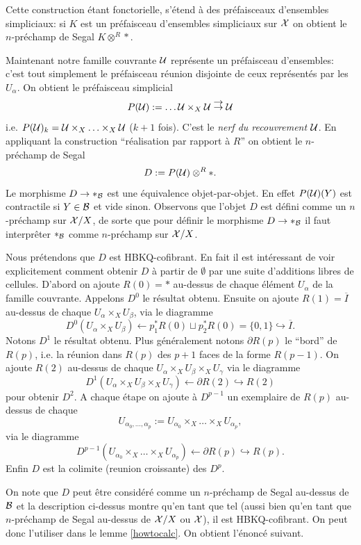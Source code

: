 \documentclass[12pt]{article}
\newcommand{\Bb}{{\cal B}}
\newcommand{\Uu}{{\cal U}}
\newcommand{\Xx}{{\cal X}}
\newcommand{\tworightarrows}{\stackrel{\displaystyle \rightarrow}{\rightarrow}}
\begin{document}
Cette construction \'etant fonctorielle, s'\'etend \`a des pr\'efaisceaux
d'ensembles simpliciaux: si $K$ est un pr\'efaisceau d'ensembles simpliciaux sur
$\Xx$ on obtient le $n$-pr\'echamp de Segal $K\otimes ^R\ast$.

Maintenant notre famille couvrante $\Uu$ repr\'esente un pr\'efaisceau
d'ensembles: c'est tout simplement le pr\'efaisceau r\'eunion disjointe
de ceux repr\'esent\'es
par les $U_{\alpha}$. On obtient le pr\'efaisceau simplicial
$$
P(\Uu ):= \ldots \Uu \times _X \Uu \tworightarrows \Uu
$$
i.e. $P(\Uu )_k=\Uu \times _X \ldots \times _X\Uu $ ($k+1$ fois).
C'est le {\em nerf du recouvrement $\Uu$}. En appliquant la construction
``r\'ealisation par rapport \`a $R$'' on obtient le $n$-pr\'echamp de Segal
$$
D:= P(\Uu )\otimes ^R \ast .
$$
Le morphisme $D\rightarrow \ast _{\Bb}$ est une
\'equivalence objet-par-objet.  En effet $P(\Uu )(Y)$ est contractile si
$Y\in \Bb$
et vide sinon. Observons que l'objet $D$ est d\'efini
comme un $n$-pr\'echamp sur $\Xx /X$, de sorte que
pour d\'efinir le morphisme $D\rightarrow \ast
_{\Bb}$ il faut interpr\^eter $\ast _{\Bb}$ comme $n$-pr\'echamp sur $\Xx /X$.

Nous pr\'etendons que $D$ est HBKQ-cofibrant. En fait il est int\'eressant de voir
explicitement comment obtenir $D$ \`a partir de $\emptyset$ par une suite
d'additions libres de cellules. D'abord on ajoute $R(0)=\ast$ au-dessus de
chaque
\'el\'ement $U_{\alpha}$ de la famille couvrante. Appelons $D^0$ le
r\'esultat obtenu. Ensuite on ajoute  $R(1)=\overline{I}$ au-dessus de chaque
$U_{\alpha}
\times _XU_{\beta}$, via le diagramme
$$
D^0(U_{\alpha} \times _XU_{\beta}) \leftarrow p_1^{\ast}R(0)\sqcup
p_2^{\ast}R(0) = \{ 0,1\} \hookrightarrow \overline{I}.
$$
Notons $D^1$ le r\'esultat obtenu. Plus g\'en\'eralement notons
$\partial R(p)$ le
``bord'' de $R(p)$, i.e. la r\'eunion dans $R(p)$ des $p+1$ faces de la forme
$R(p-1)$. On ajoute $R(2)$ au-dessus de chaque $U_{\alpha}\times _XU_{\beta}
\times _XU_{\gamma}$ via le diagramme
$$
D^1(U_{\alpha}\times _XU_{\beta}
\times _XU_{\gamma})\leftarrow \partial R(2) \hookrightarrow  R(2)
$$
pour obtenir $D^2$. A chaque \'etape on ajoute \`a $D^{p-1}$ un exemplaire de
$R(p)$ au-dessus de chaque
$$
U_{\alpha _0,\ldots , \alpha _p}:=U_{\alpha _0}
\times _X\ldots \times _X U_{\alpha_p},
$$
via le diagramme
$$
D^{p-1}(U_{\alpha _0} \times _X\ldots \times _X
U_{\alpha_p})\leftarrow \partial R(p) \hookrightarrow  R(p).
$$
Enfin $D$ est la colimite (reunion croissante) des $D^p$.

On note que $D$ peut \^etre consid\'er\'e comme un $n$-pr\'echamp de Segal
au-dessus
de $\Bb$ et la description ci-dessus montre qu'en tant que tel (aussi bien
qu'en tant que $n$-pr\'echamp de Segal au-dessus de $\Xx /X$ ou $\Xx$), il est
HBKQ-cofibrant. On peut donc l'utiliser dans le lemme \ref{howtocalc}.
On obtient l'\'enonc\'e suivant.
\end{document}
